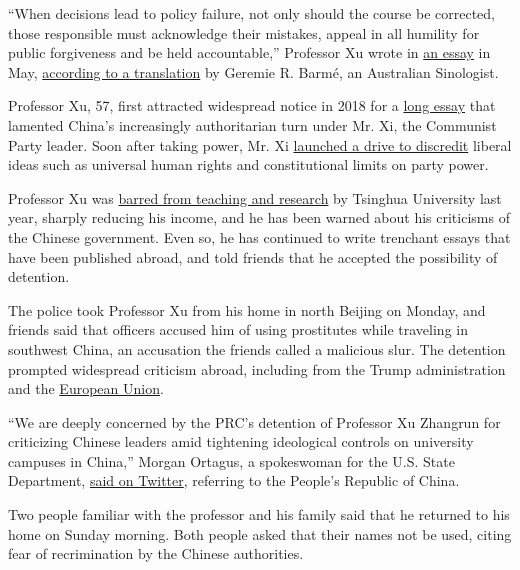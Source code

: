 ``When decisions lead to policy failure, not only should the course be
corrected, those responsible must acknowledge their mistakes, appeal in
all humility for public forgiveness and be held accountable,'' Professor
Xu wrote in
\href{https://www.chinese-future.org/articles/6j3ywr3swgp3flagdlbk3xd2wkmjcj}{an
essay} in May,
\href{http://chinaheritage.net/journal/remonstrating-with-beijing-xu-zhangruns-advice-to-chinas-national-peoples-congress-21-may-2020/}{according
to a translation} by Geremie R. Barmé, an Australian Sinologist.

Professor Xu, 57, first attracted widespread notice in 2018 for a
\href{http://chinaheritage.net/journal/imminent-fears-immediate-hopes-a-beijing-jeremiad/}{long
essay} that lamented China's increasingly authoritarian turn under Mr.
Xi, the Communist Party leader. Soon after taking power, Mr. Xi
\href{https://www.nytimes3xbfgragh.onion/2013/08/20/world/asia/chinas-new-leadership-takes-hard-line-in-secret-memo.html}{launched
a drive to discredit} liberal ideas such as universal human rights and
constitutional limits on party power.

Professor Xu was
\href{https://www.nytimes3xbfgragh.onion/2019/03/26/world/asia/chinese-law-professor-xi.html}{barred
from teaching and research} by Tsinghua University last year, sharply
reducing his income, and he has been warned about his criticisms of the
Chinese government. Even so, he has continued to write trenchant essays
that have been published abroad, and told friends that he accepted the
possibility of detention.

The police took Professor Xu from his home in north Beijing on Monday,
and friends said that officers accused him of using prostitutes while
traveling in southwest China, an accusation the friends called a
malicious slur. The detention prompted widespread criticism abroad,
including from the Trump administration and the
\href{https://eeas.europa.eu/headquarters/headquarters-homepage/82435/china-statement-spokesperson-5th-anniversary-\%E2\%80\%9C709-crackdown\%E2\%80\%9D-human-rights-lawyers-and_en}{European
Union}.

``We are deeply concerned by the PRC's detention of Professor Xu
Zhangrun for criticizing Chinese leaders amid tightening ideological
controls on university campuses in China,'' Morgan Ortagus, a
spokeswoman for the U.S. State Department,
\href{https://twitter.com/statedeptspox/status/1280529327826837504}{said
on Twitter}, referring to the People's Republic of China.

Two people familiar with the professor and his family said that he
returned to his home on Sunday morning. Both people asked that their
names not be used, citing fear of recrimination by the Chinese
authorities.

